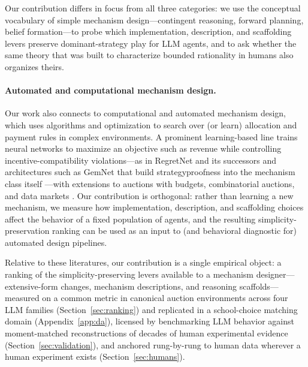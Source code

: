 Our contribution differs in focus from all three categories: we use the conceptual vocabulary of simple mechanism design---contingent reasoning, forward planning, belief formation---to probe which implementation, description, and scaffolding levers preserve dominant-strategy play for LLM agents, and to ask whether the same theory that was built to characterize bounded rationality in humans also organizes theirs.

\paragraph{Automated and computational mechanism design.}
Our work also connects to computational and automated mechanism design, which uses algorithms and optimization to search over (or learn) allocation and payment rules in complex environments. A prominent learning-based line trains neural networks to maximize an objective such as revenue while controlling incentive-compatibility violations---as in RegretNet and its successors \citep{dutting2024optimal, curry102automated} and architectures such as GemNet that build strategyproofness into the mechanism class itself \citep{wang2024gemnet}---with extensions to auctions with budgets, combinatorial auctions, and data markets \citep{feng2018deep, wang2025bundleflow, ravindranath2023data}. Our contribution is orthogonal: rather than learning a new mechanism, we measure how implementation, description, and scaffolding choices affect the behavior of a fixed population of agents, and the resulting simplicity-preservation ranking can be used as an input to (and behavioral diagnostic for) automated design pipelines.

\bigskip

Relative to these literatures, our contribution is a single empirical object: a ranking of the simplicity-preserving levers available to a mechanism designer---extensive-form changes, mechanism descriptions, and reasoning scaffolds---measured on a common metric in canonical auction environments across four LLM families (Section~\ref{sec:ranking}) and replicated in a school-choice matching domain (Appendix~\ref{app:da}), licensed by benchmarking LLM behavior against moment-matched reconstructions of decades of human experimental evidence (Section~\ref{sec:validation}), and anchored rung-by-rung to human data wherever a human experiment exists (Section~\ref{sec:humans}).
